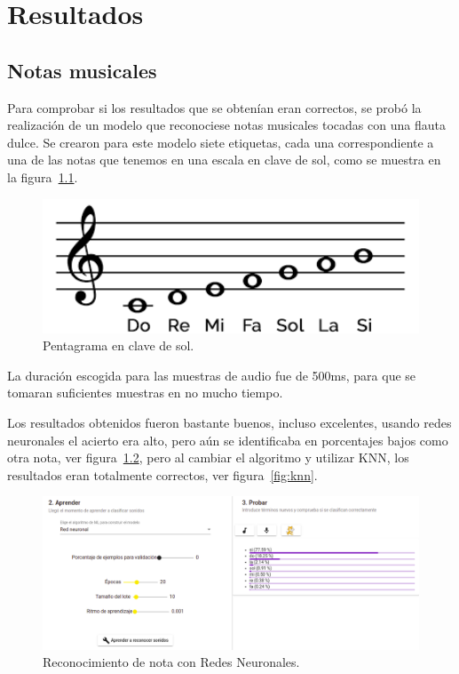 \documentclass[a4paper, 12pt]{book}
\begin{document}

\cleardoublepage
\chapter{Resultados}
\label{chap:resultados}

\section{Notas musicales}
\label{sec:notas-musicales-res}

Para comprobar si los resultados que se obtenían eran correctos, se probó la realización de un modelo que reconociese notas musicales tocadas con una flauta dulce. Se crearon para este modelo siete etiquetas, cada una correspondiente a una de las notas que tenemos en una escala en clave de sol, como se muestra en la figura~\ref{fig:pentagrama}.

\begin{figure}
	\centering
	\includegraphics[width=12cm, keepaspectratio]{img/pentagrama.png}
	\caption{Pentagrama en clave de sol.}
	\label{fig:pentagrama}
\end{figure}

La duración escogida para las muestras de audio fue de 500ms, para que se tomaran suficientes muestras en no mucho tiempo.

Los resultados obtenidos fueron bastante buenos, incluso excelentes, usando redes neuronales el acierto era alto, pero aún se identificaba en porcentajes bajos como otra nota, ver figura~\ref{fig:neural-networks}, pero al cambiar el algoritmo y utilizar KNN, los resultados eran totalmente correctos, ver figura~\ref{fig:knn}.

\begin{figure}
	\centering
	\includegraphics[width=12cm, keepaspectratio]{img/nn1.png}
	\caption{Reconocimiento de nota con Redes Neuronales.}
	\label{fig:neural-networks}
\end{figure}
\end{document}
